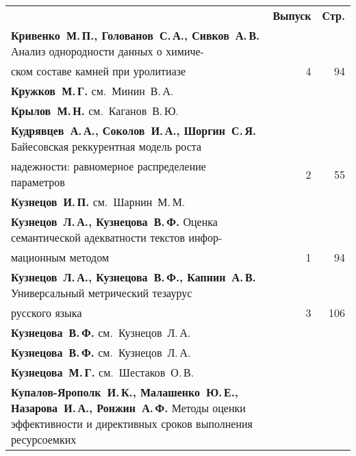 \pagebreak

\def\leftkol{АВТОРСКИЙ УКАЗАТЕЛЬ ЗА 2013 г.} %

\def\rightkol{АВТОРСКИЙ УКАЗАТЕЛЬ ЗА 2013 г.} %

{\tabcolsep=3pt
\begin{tabular}{p{388pt}rr}
&\textbf{Выпуск} & \textbf{Стр.}\\[3pt]
\textbf{Кривенко~М.\,П., Голованов~С.\,А., Сивков~А.\,В.}
Анализ однородности данных о химиче-\linebreak
\vspace*{-12pt}\\
\hspace*{23pt}ском составе камней при уролитиазе\dotfill&4&94\\
\textbf{Кружков~М.\,Г.} см.~Минин~В.\,А.&&\\
\textbf{Крылов~М.\,Н.} см.~Каганов~В.\,Ю.&&\\
\textbf{Кудрявцев~А.\,А., Соколов~И.\,А., Шоргин~С.\,Я.}
Байесовская реккурентная модель роста\linebreak
\vspace*{-12pt}\\
\hspace*{23pt}надежности: равномерное распределение параметров\dotfill&2&55\\
\textbf{Кузнецов~И.\,П.} см.~Шарнин~М.\,М.&&\\
\textbf{Кузнецов~Л.\,А., Кузнецова~В.\,Ф.}
Оценка семантической адекватности текстов инфор-\linebreak
\vspace*{-12pt}\\
\hspace*{23pt}мационным методом\dotfill&1&94\\
\textbf{Кузнецов~Л.\,А., Кузнецова~В.\,Ф., Капнин~А.\,В.}
Универсальный метрический тезаурус\linebreak
\vspace*{-12pt}\\
\hspace*{23pt}русского языка\dotfill&3&106\\
\textbf{Кузнецова~В.\,Ф.} см.~Кузнецов~Л.\,А.&&\\
\textbf{Кузнецова~В.\,Ф.} см.~Кузнецов~Л.\,А.&&\\
\textbf{Кузнецова~М.\,Г.} см.~Шестаков~О.\,В.&&\\
\hangindent=23pt\noindent\textbf{Купалов-Ярополк~И.\,К., Малашенко~Ю.\,Е., Назарова~И.\,А.,
Ронжин~А.\,Ф.}
Методы оценки эффективности и директивных сроков выполнения ресурсоемких

\end{tabular}}
